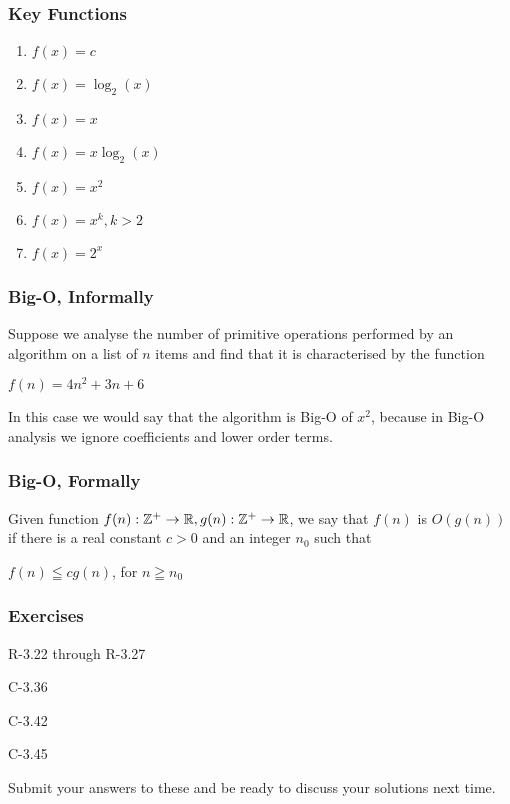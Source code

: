\documentclass[10pt]{beamer}
\begin{document}
\begin{frame}
	\frametitle{Key Functions}
	\begin{enumerate}
		\item $f(x) = c$
		\item $f(x) = \log_{2}(x)$
		\item $f(x) = x$
		\item $f(x) = x\log_{2}(x)$
		\item $f(x) = x^{2}$
		\item $f(x) = x^{k}, k > 2$
		\item $f(x) = 2^{x}$
	\end{enumerate}
\end{frame}

\begin{frame}
	\frametitle{Big-O, Informally}
	
	Suppose we analyse the number of primitive operations performed by an 
	algorithm on a list of $n$ items and find that it is characterised by the 
	function 
	
	$f(n) = 4n^{2} + 3n + 6$
	
	In this case we would say that the algorithm is Big-O of $x^{2}$, because in Big-O
	analysis we ignore coefficients and lower order terms.
\end{frame}

\begin{frame}
	\frametitle{Big-O, Formally}
	
	Given function $f(n):\Bbb Z^{+}\rightarrow\Bbb R, g(n):\Bbb Z^{+}\rightarrow\Bbb R$, we say that 
	$f(n)$ is $O(g(n))$ if there is a real constant $c>0$ and an integer $n_{0}$ such that
	
	\vspace{5mm}
	
	$f(n) \leqq cg(n)$, for $n \geqq n_{0}$
	
\end{frame}

\begin{frame}
	\frametitle{Exercises}
	
	R-3.22 through R-3.27
	
	C-3.36
	
	C-3.42
	
	C-3.45
	
	\vspace{5mm}
	Submit your answers to these and be ready to discuss your solutions next time.
	
\end{frame}
\end{document}
